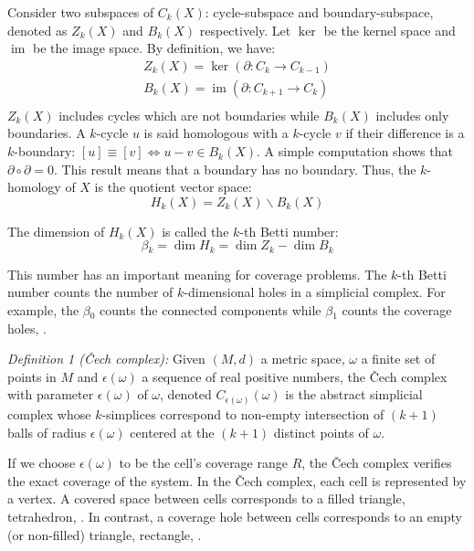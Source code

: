 \documentclass[conference]{IEEEtran}
\makeatletter
\newcommand*{\etc}{\@ifnextchar{.}{etc}{etc.\@\xspace}}
\DeclareMathOperator{\ima}{im}
\makeatother
\begin{document}
Consider two subspaces of $C_k(X)$: cycle-subspace and
boundary-subspace, denoted as $Z_k(X)$ and $B_k(X)$
respectively. Let $\ker$ be the kernel space and $\ima$ be the image space. By definition, we have:
\begin{equation*}
	\begin{array}{l}
		Z_k(X) = \ker(\partial: C_k \to C_{k-1})\\
		B_k(X) = \ima(\partial: C_{k+1} \to C_{k})\\
	\end{array}
\end{equation*}
$Z_k(X)$ includes cycles which are not boundaries while
$B_k(X)$ includes only boundaries.  A $k$-cycle $u$ is said homologous with a $k$-cycle $v$ if their
difference is a $k$-boundary: $[u] \equiv [v] \Longleftrightarrow u -
v \in B_k(X)$. A simple computation shows that $\partial
\circ \partial = 0$. This result means that a boundary has no
boundary. Thus, the $k$-homology of $X$ is the quotient vector space:
\begin{equation*}
H_k(X) = Z_k(X) \backslash B_k(X)
\end{equation*}

The dimension of $H_k(X)$ is called the $k$-th Betti number:
\begin{equation}
\label{eq:bettiComputation}
\beta{}_k = \dim{H_k} = \dim{Z_k} - \dim{B_k}
\end{equation}

This number has an important meaning for coverage problems. The 
$k$-th Betti number counts the number of $k$-dimensional holes in
a simplicial complex. For example, the $\beta{}_0$ counts the connected
components while $\beta{}_1$ counts the coverage holes,
\etc. \par

\textit{Definition 1 (\v{C}ech complex):} Given $(M,d)$ a metric
space, $\omega$ a finite set of points in $M$ and $\epsilon(\omega)$ a sequence of real
positive numbers, the \v{C}ech complex with parameter $\epsilon(\omega)$ of
$\omega$, denoted $C_{\epsilon(\omega)}(\omega)$ is the abstract simplicial
complex whose $k$-simplices correspond to non-empty intersection of
$(k+1)$ balls of radius $\epsilon(\omega)$ centered at the $(k+1)$ distinct
points of $\omega$.\par

If we choose $\epsilon(\omega)$ to be the cell's coverage range $R$, the \v{C}ech
complex verifies the exact coverage of the system. In the \v{C}ech complex,
each cell is represented by a vertex. A covered space between cells
corresponds to a filled triangle, tetrahedron, \etc. In contrast, a
coverage hole between cells corresponds to an empty (or non-filled)
triangle, rectangle, \etc. \par
\end{document}
